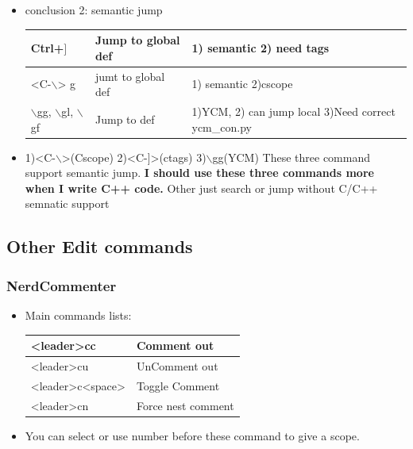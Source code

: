 \documentclass[paper=8.5in:11in, twoside, 12pt, pagesize=pdftex]{book}
\begin{document}
\begin{itemize}
										\item conclusion 2: semantic jump
										\begin{center}
											\begin{tabular}{p{0.33\textwidth}|p{0.33\textwidth}|p{}}
												\hline 
												Ctrl+$]$ &Jump to global def & 1) semantic 2) need tags \\
												
												\hline
												<C-$\backslash$> g & jumt to global def & 1) semantic 2)cscope \\
												
												
												\hline 
												$\backslash$gg, $\backslash$gl, $\backslash$gf & Jump to def & 1)YCM, 2) can jump local 3)Need correct ycm\_con.py  \\
												
											\end{tabular}
										\end{center}
										
										\item 1)<C-$\backslash$>(Cscope) 2)<C-]>(ctags) 3)$\backslash$gg(YCM) These three command support semantic jump. \textbf{I should use these three commands more when I write C++ code.}  Other just search or jump without C/C++ semnatic support
										
									\end{itemize}
									
									\subsection{Other Edit commands}
									
									\subsubsection{NerdCommenter}
									\begin{itemize}
										\item Main commands lists:  
										
										\begin{tabular}{p{}|p{}}
											\hline 
											[count]<leader>cc & Comment out \\
											\hline 
											[count]<leader>cu & UnComment out \\
											\hline 
											[count]<leader>c<space> & Toggle Comment \\
											\hline
											[count]<leader>cn & Force nest comment \\
										\end{tabular}
										\item You can select or use number before these command to give a scope. 
									\end{itemize}
									
\end{document}
